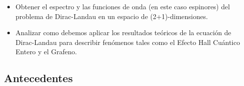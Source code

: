 \documentclass[11pt,letterpaper]{article}     %
\begin{document}
\begin{itemize} 
 
\item Obtener el espectro y las funciones de onda (en este caso espinores) del problema de Dirac-Landau en un espacio de (2+1)-dimensiones.
\item Analizar como debemos aplicar los resultados teóricos de la ecuación de Dirac-Landau para describir fenómenos tales como el Efecto Hall Cuántico Entero y el Grafeno.
\end{itemize}








\subsection{Antecedentes}
\end{document}
